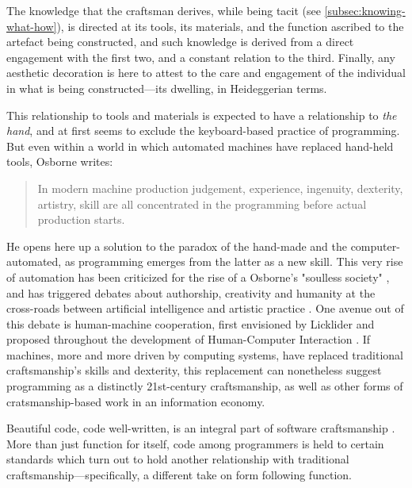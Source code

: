 The knowledge that the craftsman derives, while being tacit (see \ref{subsec:knowing-what-how}), is directed at its tools, its materials, and the function ascribed to the artefact being constructed, and such knowledge is derived from a direct engagement with the first two, and a constant relation to the third. Finally, any aesthetic decoration is here to attest to the care and engagement of the individual in what is being constructed—its dwelling, in Heideggerian terms.

This relationship to tools and materials is expected to have a relationship to \emph{the hand}, and at first seems to exclude the keyboard-based practice of programming. But even within a world in which automated machines have replaced hand-held tools, Osborne writes:

\begin{quote}
    In modern machine production judgement, experience, ingenuity, dexterity, artistry, skill are all concentrated in the programming before actual production starts. \citep{osborne_aesthetic_1977}
\end{quote}

He opens here up a solution to the paradox of the hand-made and the computer-automated, as programming emerges from the latter as a new skill. This very rise of automation has been criticized for the rise of a Osborne's "soulless society" \citep{osborne_aesthetic_1977}, and has triggered debates about authorship, creativity and humanity at the cross-roads between artificial intelligence and artistic practice \citep{mazzone_art_2019}. One avenue out of this debate is human-machine cooperation, first envisioned by Licklider and proposed throughout the development of Human-Computer Interaction \citep{licklider_mancomputer_1960,grudin_tool_2016}. If machines, more and more driven by computing systems, have replaced traditional craftsmanship's skills and dexterity, this replacement can nonetheless suggest programming as a distinctly 21st-century craftsmanship, as well as other forms of cratsmanship-based work in an information economy.

Beautiful code, code well-written, is an integral part of software craftsmanship \citep{oram_beautiful_2007}. More than just function for itself, code among programmers is held to certain standards which turn out to hold another relationship with traditional craftsmanship—specifically, a different take on form following function.

